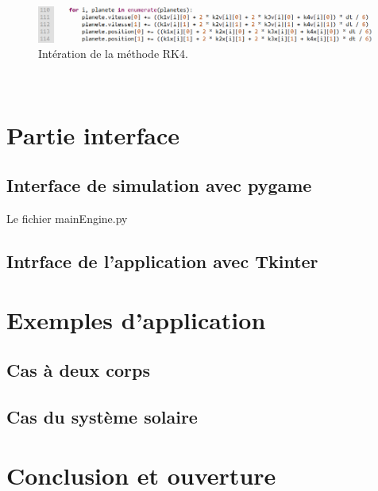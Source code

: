 \documentclass{article}
\begin{document}
             \\

            \begin{figure}[h]
                 \centering
                 \includegraphics[width=0.5\linewidth]{RK4partiefin.png}
                 \caption{\label{fig:Git}Intération de la méthode RK4.}
             \end{figure}

              \\

\section{Partie interface}
    \subsection{Interface de simulation avec pygame}

    Le fichier mainEngine.py 

    \subsection{Intrface de l'application avec Tkinter}

\section{Exemples d'application}
    \subsection{Cas à deux corps}

    \subsection{Cas du système solaire}

\section{Conclusion et ouverture}
\end{document}
